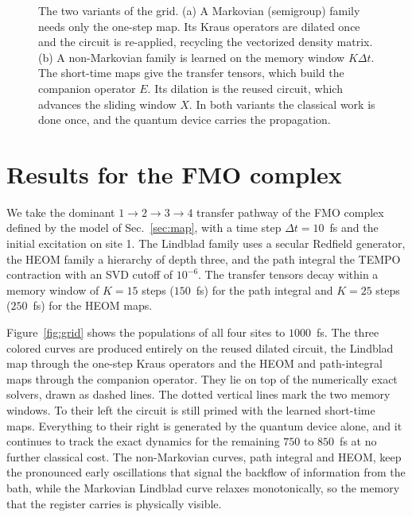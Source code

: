 \documentclass[aps,pra,twocolumn,superscriptaddress,nofootinbib,longbibliography]{revtex4-2}
\newcommand{\dt}{\Delta t}
\begin{document}
\begin{figure}[t]
\caption{\label{fig:schematic}
The two variants of the grid. (a) A Markovian (semigroup) family needs only the
one-step map. Its Kraus operators are dilated once and the circuit is re-applied,
recycling the vectorized density matrix. (b) A non-Markovian family is learned on
the memory window $K\dt$. The short-time maps give the transfer tensors, which
build the companion operator $E$. Its dilation is the reused circuit, which
advances the sliding window $X$. In both variants the classical work is done
once, and the quantum device carries the propagation.}
\end{figure}

\section{Results for the FMO complex}
\label{sec:results}
We take the dominant $1\to2\to3\to4$ transfer pathway of the FMO complex defined
by the model of Sec.~\ref{sec:map}, with a time step $\dt=10$~fs and the initial
excitation on site 1. The Lindblad family uses a secular Redfield generator, the
HEOM family a hierarchy of depth three, and the path integral the TEMPO
contraction with an SVD cutoff of $10^{-6}$. The transfer tensors decay within a
memory window of $K=15$ steps ($150$~fs) for the path integral and $K=25$ steps
($250$~fs) for the HEOM maps.

Figure~\ref{fig:grid} shows the populations of all four sites to $1000$~fs. The
three colored curves are produced entirely on the reused dilated circuit, the
Lindblad map through the one-step Kraus operators and the HEOM and path-integral
maps through the companion operator. They lie on top of the numerically exact
solvers, drawn as dashed lines. The dotted vertical lines mark the two memory
windows. To their left the circuit is still primed with the learned short-time
maps. Everything to their right is generated by the quantum device alone, and it
continues to track the exact dynamics for the remaining $750$ to $850$~fs at no
further classical cost. The non-Markovian curves, path integral and HEOM, keep
the pronounced early oscillations that signal the backflow of information from
the bath, while the Markovian Lindblad curve relaxes monotonically, so the
memory that the register carries is physically visible.
\end{document}
